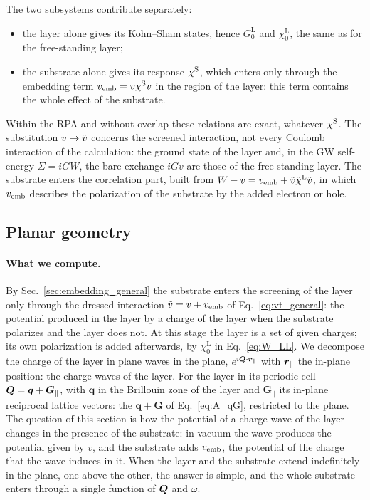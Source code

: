 \documentclass[10pt,a4paper]{paper}
\begin{document}
The two subsystems contribute separately:
\begin{itemize}
\item the layer alone gives its Kohn--Sham states, hence $G_0^{\mathrm{L}}$ and $\chi_0^{\mathrm{L}}$, the same as
  for the free-standing layer;
\item the substrate alone gives its response $\chi^{\mathrm{S}}$, which enters only through the embedding term $v_{\mathrm{emb}} = v\chi^{\mathrm{S}} v$
  in the region of the layer: this term contains the whole effect of the substrate.
\end{itemize}
Within the RPA and without overlap these relations are exact, whatever $\chi^{\mathrm{S}}$. The substitution $v \to \tilde{v}$
concerns the screened interaction, not every Coulomb interaction of the calculation: the ground state of the layer
and, in the GW self-energy $\Sigma = iGW$, the bare exchange $iGv$ are those of the free-standing layer. The substrate
enters the correlation part, built from $W - v = v_{\mathrm{emb}} + \tilde{v}\tilde{\chi}^{\mathrm{L}}\tilde{v}$, in which $v_{\mathrm{emb}}$ describes the polarization
of the substrate by the added electron or hole.

\subsection{Planar geometry}
\label{sec:embedding_planar}

\paragraph{What we compute.} By Sec.~\ref{sec:embedding_general} the substrate enters the screening of the layer only
through the dressed interaction $\tilde{v} = v + v_{\mathrm{emb}}$ of Eq.~\eqref{eq:vt_general}: the potential produced in the layer by
a charge of the layer when the substrate polarizes and the layer does not. At this stage the layer is a set of given
charges; its own polarization is added afterwards, by $\chi_0^{\mathrm{L}}$ in Eq.~\eqref{eq:W_LL}. We decompose the
charge of the layer in plane waves in the plane, $e^{i\bm{Q}\cdot\bm{r}_{\parallel}}$ with $\bm{r}_{\parallel}$ the in-plane position: the charge
waves of the layer. For the layer in its periodic cell $\bm{Q} = \bm{q} + \bm{G}_{\parallel}$, with $\bm{q}$ in the
Brillouin zone of the layer and $\bm{G}_{\parallel}$ its in-plane reciprocal lattice vectors: the $\bm{q} + \bm{G}$ of
Eq.~\eqref{eq:A_qG}, restricted to the plane. The question of this section is how the potential of a charge wave of
the layer changes in the presence of the substrate: in vacuum the wave produces the potential given by $v$, and the
substrate adds $v_{\mathrm{emb}}$, the potential of the charge that the wave induces in it. When the layer and the substrate
extend indefinitely in the plane, one above the other, the answer is simple, and the whole substrate enters through a single function of $\bm{Q}$ and $\omega$.
\end{document}
